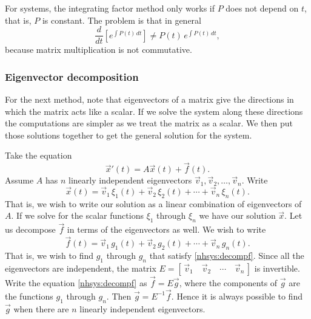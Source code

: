 For systems, the integrating factor method
only works if $P$ does not depend on $t$, that is,
$P$ is constant.  The
problem is that in general
\begin{equation*}
\frac{d}{dt} \left[ e^{\int P(t)\,dt} \right] \not= P(t) \, e^{\int P(t)\,dt} ,
\end{equation*}
because matrix multiplication is not commutative.

\subsubsection{Eigenvector decomposition}

For the next method, note that eigenvectors of a matrix give the 
directions in which the matrix acts like a scalar.  If we solve
the system along these directions the computations are simpler as we
treat the matrix as a scalar.  We then
put those solutions together to get the general solution
for the system.

Take the equation
\begin{equation} \label{nhsys:ednhsys}
{\vec{x}}' (t) = A \vec{x}(t) + \vec{f}(t) .
\end{equation}
Assume $A$ has $n$ linearly independent eigenvectors
$\vec{v}_1, \vec{v}_2, \ldots, \vec{v}_n$.  Write
\begin{equation} \label{nhsys:decompx}
\vec{x}(t) =
\vec{v}_1 \, \xi_1(t) + 
\vec{v}_2 \, \xi_2(t) + \cdots +
\vec{v}_n \, \xi_n(t) .
\end{equation}
That is, we wish to write our solution as a linear combination of
eigenvectors of $A$.
If we solve for the scalar functions $\xi_1$ through $\xi_n$ we have
our solution $\vec{x}$.
Let us decompose $\vec{f}$ in terms of the eigenvectors as well.  We wish to write
\begin{equation} \label{nhsys:decompf}
\vec{f}(t) =
\vec{v}_1 \, g_1(t) + 
\vec{v}_2 \, g_2(t) + \cdots +
\vec{v}_n \, g_n(t) .
\end{equation}
That is, we wish to find $g_1$ through $g_n$ that satisfy
\eqref{nhsys:decompf}.  Since all the eigenvectors
are independent, the matrix
$E = [\, \vec{v}_1 \quad \vec{v}_2 \quad \cdots \quad \vec{v}_n \,]$
is invertible.  Write the equation \eqref{nhsys:decompf}
as $\vec{f} = E \vec{g}$, where the components of
$\vec{g}$ are the functions $g_1$ through $g_n$.
Then $\vec{g} = E^{-1} \vec{f}$.
Hence it is always possible to find $\vec{g}$ when there
are $n$ linearly independent eigenvectors.


